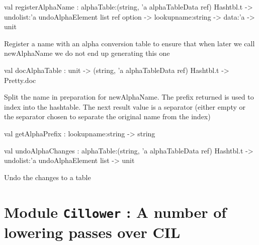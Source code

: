 \documentclass[11pt]{article}
\begin{document}
\label{val:Alpha.registerAlphaName}\begin{ocamldoccode}
val registerAlphaName :
  alphaTable:(string, 'a alphaTableData ref) Hashtbl.t ->
  undolist:'a undoAlphaElement list ref option ->
  lookupname:string -> data:'a -> unit
\end{ocamldoccode}
\begin{ocamldocdescription}
Register a name with an alpha conversion table to ensure that when later 
 we call newAlphaName we do not end up generating this one


\end{ocamldocdescription}




\label{val:Alpha.docAlphaTable}\begin{ocamldoccode}
val docAlphaTable :
  unit ->
  (string, 'a alphaTableData ref) Hashtbl.t -> Pretty.doc
\end{ocamldoccode}
\begin{ocamldocdescription}
Split the name in preparation for newAlphaName. The prefix returned is 
    used to index into the hashtable. The next result value is a separator 
    (either empty or the separator chosen to separate the original name from 
     the index)


\end{ocamldocdescription}




\label{val:Alpha.getAlphaPrefix}\begin{ocamldoccode}
val getAlphaPrefix : lookupname:string -> string
\end{ocamldoccode}




\label{val:Alpha.undoAlphaChanges}\begin{ocamldoccode}
val undoAlphaChanges :
  alphaTable:(string, 'a alphaTableData ref) Hashtbl.t ->
  undolist:'a undoAlphaElement list -> unit
\end{ocamldoccode}
\begin{ocamldocdescription}
Undo the changes to a table


\end{ocamldocdescription}


\section{Module {\tt{Cillower}} : A number of lowering passes over CIL}
\label{module:Cillower}
\end{document}
